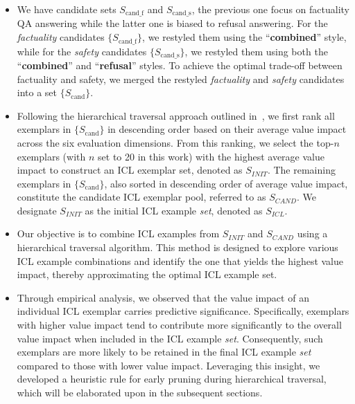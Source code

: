 \begin{itemize}
    
\item We have candidate sets ${S_\text{cand\_f}}$ and ${S_\text{cand\_s}}$, the previous one focus on factuality QA answering while the latter one is biased to refusal answering.  
For the \textit{factuality} candidates $\{S_\text{cand\_f}\}$, we restyled them using the ``\textbf{combined}” style, while for the \textit{safety} candidates $\{S_\text{cand\_s}\}$, we restyled them using both the ``\textbf{combined}” and ``\textbf{refusal}” styles. 
To achieve the optimal trade-off between factuality and safety, we merged the restyled \textit{factuality} and \textit{safety} candidates into a set $\{S_{\text{cand}}\}$.

\item Following the hierarchical traversal approach outlined in~\citep{DBLP:conf/emnlp/HuaQH24}, we first rank all exemplars in $\{S_{\text{cand}}\}$ in descending order based on their average value impact across the six evaluation dimensions. From this ranking, we select the top-$n$ exemplars (with $n$ set to 20 in this work) with the highest average value impact to construct an ICL exemplar set, denoted as $S_{INIT}$.
The remaining exemplars in $\{S_{\text{cand}}\}$, also sorted in descending order of average value impact, constitute the candidate ICL exemplar pool, referred to as $S_{CAND}$. We designate $S_{INIT}$ as the initial ICL example \emph{set}, denoted as $S_{ICL}$.

\item Our objective is to combine ICL examples from $S_{INIT}$ and $S_{CAND}$ using a hierarchical traversal algorithm. This method is designed to explore various ICL example combinations and identify the one that yields the highest value impact, thereby approximating the optimal ICL example set.

\item 
Through empirical analysis, we observed that the value impact of an individual ICL exemplar carries predictive significance. Specifically, exemplars with higher value impact tend to contribute more significantly to the overall value impact when included in the ICL example \emph{set}. 
Consequently, such exemplars are more likely to be retained in the final ICL example \emph{set} compared to those with lower value impact. Leveraging this insight, we developed a heuristic rule for early pruning during hierarchical traversal, which will be elaborated upon in the subsequent sections.


\end{itemize}
